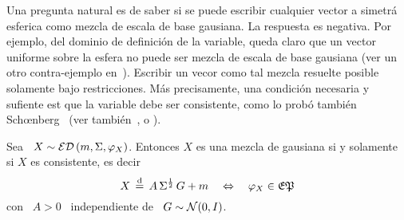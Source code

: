 Una  pregunta natural  es  de saber  si  se puede  escribir  cualquier vector  a
simetr\'a  esferica como mezcla  de escala  de base  gausiana.  La  respuesta es
negativa. Por ejemplo,  del dominio de definici\'on de  la variable, queda claro
que un  vector uniforme sobre la  esfera no puede  ser mezcla de escala  de base
gausiana (ver  un otro contra-ejemplo en~\cite{Pic70}).  Escribir  un vecor como
tal mezcla  resuelte posible  solamente bajo restricciones.  M\'as precisamente,
una condici\'on necesaria  y sufiente est que la  variable debe ser consistente,
como    lo    prob\'o    tambi\'en    Sch{\oe}nberg~\cite[Teo.~2]{Sch38}    (ver
tambi\'en~\cite[Teo.~2]{SteVan05},            \cite[Lem.~2.2]{Yao94}           o
\cite[Teo.~1]{Kan94}).
%
\begin{teorema}
\label{Teo:MP:SchoenbergCaracteristica}
%
  Sea \ $X \sim  \mathcal{ED}\left( m , \Sigma , \varphi_X \right)$.  Entonces $X$ es una
  mezcla de  gausiana si y  solamente si $X$  es consistente, es decir
  \[
  X \,  \stackrel{\mathrm{d}}{=} \,  A \, \Sigma^{\frac12}  \, G  + m \quad  \Leftrightarrow \quad
  \varphi_X \in \mathfrak{EP}
  \]
  con \ $A > 0$ \ independiente de \ $G \sim \mathcal{N}(0,I)$.
\end{teorema}
%
